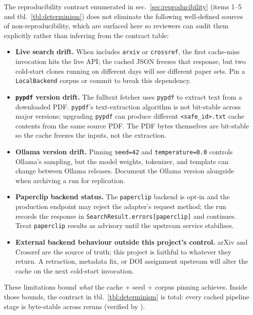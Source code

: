 \documentclass[
  english,
]{article}
\providecommand{\tightlist}{%
  \setlength{\itemsep}{0pt}\setlength{\parskip}{0pt}}
\begin{document}
The reproducibility contract enumerated in
sec.~\ref{sec:reproducibility} (items 1--5 and
tbl.~\ref{tbl:determinism}) does not eliminate the following
well-defined sources of non-reproducibility, which are surfaced here so
reviewers can audit them explicitly rather than inferring from the
contract table:

\begin{itemize}
\tightlist
\item
  \textbf{Live search drift.} When
   includes \texttt{arxiv} or
  \texttt{crossref}, the first cache-miss invocation hits the live API;
  the cached JSON freezes that response, but two cold-start clones
  running on different days will see different paper sets. Pin a
  \texttt{LocalBackend} corpus or commit 
  to break this dependency.
\item
  \textbf{\texttt{pypdf} version drift.} The fulltext fetcher uses
  \texttt{pypdf} to extract text from a downloaded PDF. \texttt{pypdf}'s
  text-extraction algorithm is not bit-stable across major versions;
  upgrading \texttt{pypdf} can produce different
  \texttt{\textless{}safe\_id\textgreater{}.txt} cache contents from the
  same source PDF. The PDF bytes themselves are bit-stable so the cache
  freezes the inputs, not the extraction.
\item
  \textbf{Ollama version drift.} Pinning \texttt{seed=42} and
  \texttt{temperature=0.0} controls Ollama's sampling, but the model
  weights, tokenizer, and template can change between Ollama releases.
  Document the Ollama version alongside  when
  archiving a run for replication.
\item
  \textbf{Paperclip backend status.} The \texttt{paperclip} backend is
  opt-in and the production endpoint may reject the adapter's request
  method; the run records the response in
  \texttt{SearchResult.errors{[}paperclip{]}} and continues. Treat
  \texttt{paperclip} results as advisory until the upstream service
  stabilises.
\item
  \textbf{External backend behaviour outside this project's control.}
  arXiv and Crossref are the source of truth; this project is faithful
  to whatever they return. A retraction, metadata fix, or DOI assignment
  upstream will alter the cache on the next cold-start invocation.
\end{itemize}

These limitations bound \emph{what} the cache + seed + corpus pinning
achieves. Inside those bounds, the contract in
tbl.~\ref{tbl:determinism} is total: every cached pipeline stage is
byte-stable across reruns (verified by
).
\end{document}
